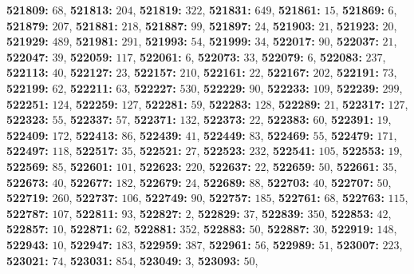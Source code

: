 \textsf{\bfseries 521809:} $68$, \textsf{\bfseries 521813:} $204$, \textsf{\bfseries 521819:} $322$, \textsf{\bfseries 521831:} $649$, \textsf{\bfseries 521861:} $15$, \textsf{\bfseries 521869:} $6$, \textsf{\bfseries 521879:} $207$, \textsf{\bfseries 521881:} $218$, \textsf{\bfseries 521887:} $99$, \textsf{\bfseries 521897:} $24$, \textsf{\bfseries 521903:} $21$, \textsf{\bfseries 521923:} $20$, \textsf{\bfseries 521929:} $489$, \textsf{\bfseries 521981:} $291$, \textsf{\bfseries 521993:} $54$, \textsf{\bfseries 521999:} $34$, \textsf{\bfseries 522017:} $90$, \textsf{\bfseries 522037:} $21$, \textsf{\bfseries 522047:} $39$, \textsf{\bfseries 522059:} $117$, \textsf{\bfseries 522061:} $6$, \textsf{\bfseries 522073:} $33$, \textsf{\bfseries 522079:} $6$, \textsf{\bfseries 522083:} $237$, \textsf{\bfseries 522113:} $40$, \textsf{\bfseries 522127:} $23$, \textsf{\bfseries 522157:} $210$, \textsf{\bfseries 522161:} $22$, \textsf{\bfseries 522167:} $202$, \textsf{\bfseries 522191:} $73$, \textsf{\bfseries 522199:} $62$, \textsf{\bfseries 522211:} $63$, \textsf{\bfseries 522227:} $530$, \textsf{\bfseries 522229:} $90$, \textsf{\bfseries 522233:} $109$, \textsf{\bfseries 522239:} $299$, \textsf{\bfseries 522251:} $124$, \textsf{\bfseries 522259:} $127$, \textsf{\bfseries 522281:} $59$, \textsf{\bfseries 522283:} $128$, \textsf{\bfseries 522289:} $21$, \textsf{\bfseries 522317:} $127$, \textsf{\bfseries 522323:} $55$, \textsf{\bfseries 522337:} $57$, \textsf{\bfseries 522371:} $132$, \textsf{\bfseries 522373:} $22$, \textsf{\bfseries 522383:} $60$, \textsf{\bfseries 522391:} $19$, \textsf{\bfseries 522409:} $172$, \textsf{\bfseries 522413:} $86$, \textsf{\bfseries 522439:} $41$, \textsf{\bfseries 522449:} $83$, \textsf{\bfseries 522469:} $55$, \textsf{\bfseries 522479:} $171$, \textsf{\bfseries 522497:} $118$, \textsf{\bfseries 522517:} $35$, \textsf{\bfseries 522521:} $27$, \textsf{\bfseries 522523:} $232$, \textsf{\bfseries 522541:} $105$, \textsf{\bfseries 522553:} $19$, \textsf{\bfseries 522569:} $85$, \textsf{\bfseries 522601:} $101$, \textsf{\bfseries 522623:} $220$, \textsf{\bfseries 522637:} $22$, \textsf{\bfseries 522659:} $50$, \textsf{\bfseries 522661:} $35$, \textsf{\bfseries 522673:} $40$, \textsf{\bfseries 522677:} $182$, \textsf{\bfseries 522679:} $24$, \textsf{\bfseries 522689:} $88$, \textsf{\bfseries 522703:} $40$, \textsf{\bfseries 522707:} $50$, \textsf{\bfseries 522719:} $260$, \textsf{\bfseries 522737:} $106$, \textsf{\bfseries 522749:} $90$, \textsf{\bfseries 522757:} $185$, \textsf{\bfseries 522761:} $68$, \textsf{\bfseries 522763:} $115$, \textsf{\bfseries 522787:} $107$, \textsf{\bfseries 522811:} $93$, \textsf{\bfseries 522827:} $2$, \textsf{\bfseries 522829:} $37$, \textsf{\bfseries 522839:} $350$, \textsf{\bfseries 522853:} $42$, \textsf{\bfseries 522857:} $10$, \textsf{\bfseries 522871:} $62$, \textsf{\bfseries 522881:} $352$, \textsf{\bfseries 522883:} $50$, \textsf{\bfseries 522887:} $30$, \textsf{\bfseries 522919:} $148$, \textsf{\bfseries 522943:} $10$, \textsf{\bfseries 522947:} $183$, \textsf{\bfseries 522959:} $387$, \textsf{\bfseries 522961:} $56$, \textsf{\bfseries 522989:} $51$, \textsf{\bfseries 523007:} $223$, \textsf{\bfseries 523021:} $74$, \textsf{\bfseries 523031:} $854$, \textsf{\bfseries 523049:} $3$, \textsf{\bfseries 523093:} $50$, 

